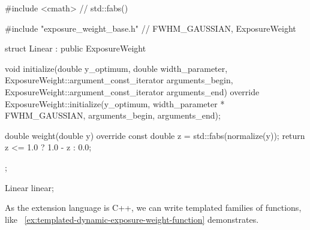 \begin{exemplar}[htbp]
  \begin{maxipage}
    \begin{cxxlisting}
#include <cmath>                     // std::fabs()

#include "exposure_weight_base.h"    // FWHM_GAUSSIAN, ExposureWeight

struct Linear : public ExposureWeight {
    void initialize(double y_optimum, double width_parameter,
                    ExposureWeight::argument_const_iterator arguments_begin,
                    ExposureWeight::argument_const_iterator arguments_end)
        override {
        ExposureWeight::initialize(y_optimum,
                                   width_parameter * FWHM_GAUSSIAN,
                                   arguments_begin, arguments_end);
    }

    double weight(double y) override {
        const double z = std::fabs(normalize(y));
        return z <= 1.0 ? 1.0 - z : 0.0;
    }
};

Linear linear;
    \end{cxxlisting}
  \end{maxipage}

  \caption[Simple dynamic exposure weight function]{%
    \label{ex:simple-dynamic-exposure-weight-function}%
    A dynamic exposure weight function that defines a ``roof-top''.  The natural width is
    exactly one, so we override method~ to rescale , passed in
    as , by multiplying with  to get the same width
    as the predefined Gaussian.}
\end{exemplar}


As the extension language is C++, we can write templated families of functions, like
\exampleName~\ref{ex:templated-dynamic-exposure-weight-function} demonstrates.


